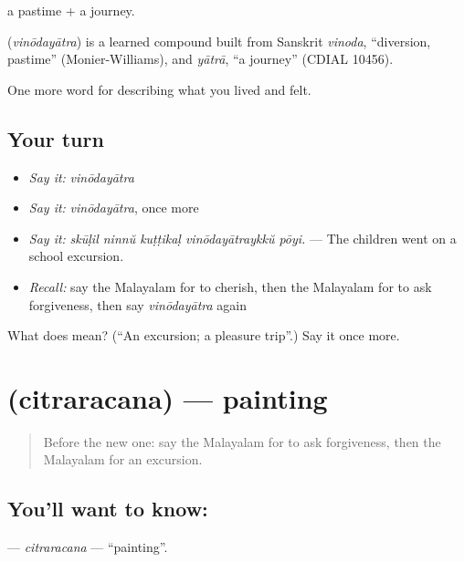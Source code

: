  a pastime +  a journey.

\begin{cousinweb}
\textbf{} (\emph{vinōdayātra}) is a learned compound built from Sanskrit \emph{vinoda}, \textquotedblleft{}diversion, pastime\textquotedblright{} (Monier-Williams), and \emph{yātrā}, \textquotedblleft{}a journey\textquotedblright{} (CDIAL 10456).
\end{cousinweb}

\begin{grammarlens}[title={What you've built}]
One more word for describing what you lived and felt.
\end{grammarlens}

\subsection*{Your turn}
\begin{itemize}
\raggedright
  \item \emph{Say it:} \emph{vinōdayātra}
  \item \emph{Say it:} \emph{vinōdayātra}, once more
  \item \emph{Say it:} \emph{skūḷil ninnŭ kuṭṭikaḷ vinōdayātraykkŭ pōyi.} — The children went on a school excursion.
  \item \emph{Recall:} say the Malayalam for to cherish, then the Malayalam for to ask forgiveness, then say \emph{vinōdayātra} again
\end{itemize}

\begin{tcolorbox}[breakable,colback=teal!4,colframe=teal!35!black,title={Before you move on}]
What does  mean? (\textquotedblleft{}An excursion; a pleasure trip\textquotedblright{}.) Say it once more.
\end{tcolorbox}
\section[\texorpdfstring{\ml{ചിത്രരചന} (citraracana)}{ചിത്രരചന (citraracana)}]{ (citraracana) — painting}

\label{lesson:ML-C560-citraracana}



\begin{quote}
Before the new one: say the Malayalam for to ask forgiveness, then the Malayalam for an excursion.
\end{quote}

\subsection*{You'll want to know: }
\textbf{} — \emph{citraracana} — \textquotedblleft{}painting\textquotedblright{}.

